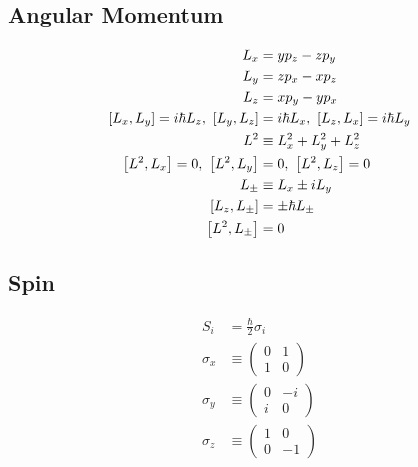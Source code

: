 \documentclass[8pt]{amsart}
\begin{document}
\begin{multicols}{3}
\subsection{Angular Momentum}%
\label{sub:angular_momentum}
\begin{align*}
  L_x&=yp_z-zp_y\\
  L_y&=zp_x-xp_z\\
  L_z&=xp_y-yp_x\\
  \comm{L_x}{L_y}=i\hbar L_z,\ 
  \comm{L_y}{L_z}&=i\hbar L_x,\ 
  \comm{L_z}{L_x}=i\hbar L_y\\
  L^2&\equiv L_x^2+L_y^2+L_z^2\\
  \comm{L^2}{L_x}=0,\ 
  \comm{L^2}{L_y}&=0,\ 
  \comm{L^2}{L_z}=0\\
  L_\pm&\equiv L_x\pm iL_y\\
  \comm{L_z}{L_\pm}&=\pm\hbar L_\pm\\
  \comm{L^2}{L_\pm}&=0
\end{align*}

\subsection{Spin}%
\label{sub:spin}
\begin{align*}
  S_i&=\frac{\hbar}{2}\sigma_i\\
  \sigma_x&\equiv\begin{pmatrix}
    0 & 1 \\ 1 & 0
  \end{pmatrix}\\
  \sigma_y&\equiv\begin{pmatrix}
    0 & -i \\ i & 0
  \end{pmatrix}\\
  \sigma_z&\equiv\begin{pmatrix}
    1 & 0 \\ 0 & -1
  \end{pmatrix}
\end{align*}

\end{multicols}
\end{document}
